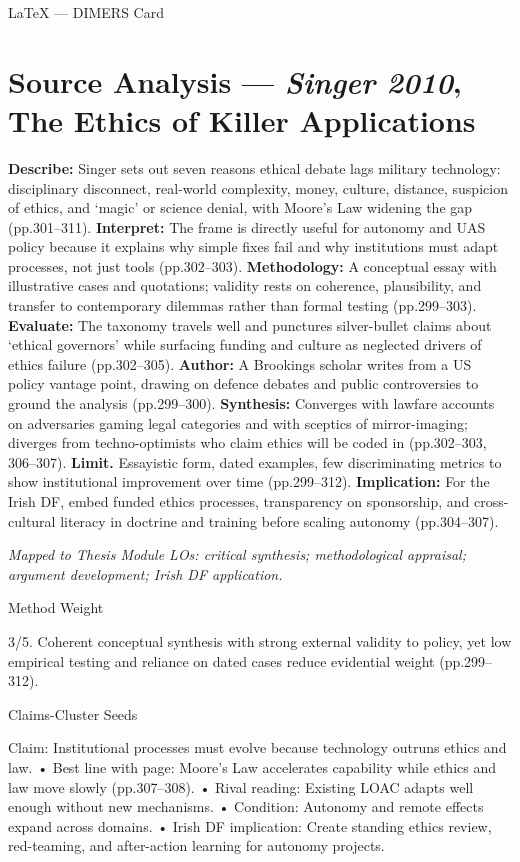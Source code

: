 LaTeX — DIMERS Card

\section*{Source Analysis — \textit{Singer 2010}, The Ethics of Killer Applications}
\textbf{Describe:} Singer sets out seven reasons ethical debate lags military technology: disciplinary disconnect, real-world complexity, money, culture, distance, suspicion of ethics, and ‘magic’ or science denial, with Moore’s Law widening the gap (pp.301–311).
\textbf{Interpret:} The frame is directly useful for autonomy and UAS policy because it explains why simple fixes fail and why institutions must adapt processes, not just tools (pp.302–303).
\textbf{Methodology:} A conceptual essay with illustrative cases and quotations; validity rests on coherence, plausibility, and transfer to contemporary dilemmas rather than formal testing (pp.299–303).
\textbf{Evaluate:} The taxonomy travels well and punctures silver-bullet claims about ‘ethical governors’ while surfacing funding and culture as neglected drivers of ethics failure (pp.302–305).
\textbf{Author:} A Brookings scholar writes from a US policy vantage point, drawing on defence debates and public controversies to ground the analysis (pp.299–300).
\textbf{Synthesis:} Converges with lawfare accounts on adversaries gaming legal categories and with sceptics of mirror-imaging; diverges from techno-optimists who claim ethics will be coded in (pp.302–303, 306–307).
\textbf{Limit.} Essayistic form, dated examples, few discriminating metrics to show institutional improvement over time (pp.299–312). \textbf{Implication:} For the Irish DF, embed funded ethics processes, transparency on sponsorship, and cross-cultural literacy in doctrine and training before scaling autonomy (pp.304–307).

\textit{Mapped to Thesis Module LOs: critical synthesis; methodological appraisal; argument development; Irish DF application.}

Method Weight

3/5. Coherent conceptual synthesis with strong external validity to policy, yet low empirical testing and reliance on dated cases reduce evidential weight (pp.299–312).

Claims-Cluster Seeds

Claim: Institutional processes must evolve because technology outruns ethics and law.
• Best line with page: Moore’s Law accelerates capability while ethics and law move slowly (pp.307–308).
• Rival reading: Existing LOAC adapts well enough without new mechanisms.
• Condition: Autonomy and remote effects expand across domains.
• Irish DF implication: Create standing ethics review, red-teaming, and after-action learning for autonomy projects.

